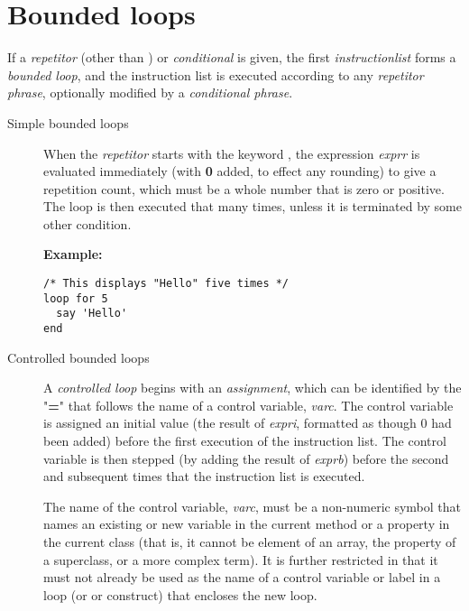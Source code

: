\section{Bounded loops}
 If a \emph{repetitor} (other than ) or
\emph{conditional} is given, the first \emph{instructionlist}
forms a \emph{bounded loop}, and the instruction list is executed
according to any \emph{repetitor phrase}, optionally modified by a
\emph{conditional phrase}.
\begin{description}
\item[Simple bounded loops]

When the \emph{repetitor} starts with the keyword ,
the expression \emph{exprr} is evaluated immediately
(with \textbf{0} added, to effect any rounding) to give a repetition
count, which must be a whole number that is zero or positive.
The loop is then executed that many times, unless it is terminated by
some other condition.

\textbf{Example:}
\begin{lstlisting}
/* This displays "Hello" five times */
loop for 5
  say 'Hello'
end
\end{lstlisting}
\item[Controlled bounded loops]
A \emph{controlled loop} begins with an \emph{assignment},
which can be identified by the "\textbf{=}" that follows the name
of a control variable, \emph{varc}.
The control variable is assigned an initial value (the result of
\emph{expri}, formatted as though 0 had been added)
before the first execution of the instruction list.
The control variable is then stepped (by adding the result of
\emph{exprb}) before the second and subsequent times that the
instruction list is executed.
 
The name of the control variable, \emph{varc}, must be a non-numeric
symbol that names an existing or new variable in the current method or a
property in the current class (that is, it cannot be element of an
array, the property of a superclass, or a more complex term).  It is
further restricted in that it must not already be used as the name of a
control variable or label in a loop (or  or 
construct) that encloses the new loop.
 

\end{description}
